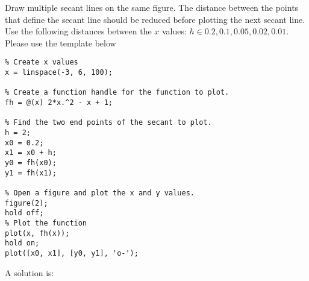 \begin{ex}
Draw multiple secant lines on the same figure.
The distance between the points that define the secant line
should be reduced before plotting the next secant line.
Use the following distances between the $x$ values:
$h \in {0.2, 0.1, 0.05, 0.02, 0.01}$.
Please use the template below
\begin{lstlisting}
% Create x values
x = linspace(-3, 6, 100);

% Create a function handle for the function to plot.
fh = @(x) 2*x.^2 - x + 1;

% Find the two end points of the secant to plot.
h = 2;
x0 = 0.2;
x1 = x0 + h;
y0 = fh(x0);
y1 = fh(x1);

% Open a figure and plot the x and y values.
figure(2);
hold off;
% Plot the function
plot(x, fh(x));
hold on;
plot([x0, x1], [y0, y1], 'o-');
\end{lstlisting}
\begin{hint}
\end{hint}
\begin{sol}
A solution is:
\begin{lstlisting}
\end{lstlisting}
\end{sol}
\end{ex}

%
%
%
%
%
%
%
%
%
%
%
%
%
%
%
%
%
%
%
%

